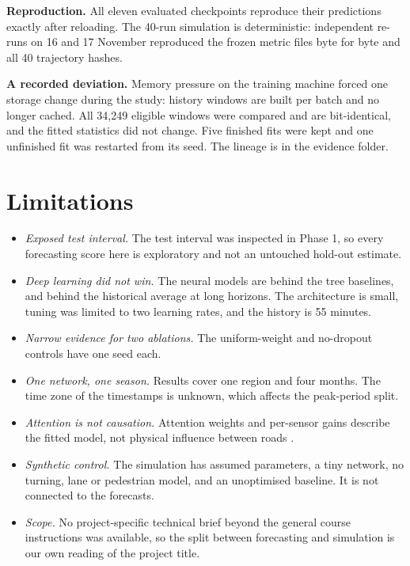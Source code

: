 \documentclass[conference]{IEEEtran}
\begin{document}
\textbf{Reproduction.} All eleven evaluated checkpoints reproduce their predictions exactly after reloading. The 40-run simulation is deterministic: independent re-runs on 16 and 17 November reproduced the frozen metric files byte for byte and all 40 trajectory hashes.

\textbf{A recorded deviation.} Memory pressure on the training machine forced one storage change during the study: history windows are built per batch and no longer cached. All 34,249 eligible windows were compared and are bit-identical, and the fitted statistics did not change. Five finished fits were kept and one unfinished fit was restarted from its seed. The lineage is in the evidence folder.

\section{Limitations}
\begin{itemize}
\item \emph{Exposed test interval.} The test interval was inspected in Phase 1, so every forecasting score here is exploratory and not an untouched hold-out estimate.
\item \emph{Deep learning did not win.} The neural models are behind the tree baselines, and behind the historical average at long horizons. The architecture is small, tuning was limited to two learning rates, and the history is 55 minutes.
\item \emph{Narrow evidence for two ablations.} The uniform-weight and no-dropout controls have one seed each.
\item \emph{One network, one season.} Results cover one region and four months. The time zone of the timestamps is unknown, which affects the peak-period split.
\item \emph{Attention is not causation.} Attention weights and per-sensor gains describe the fitted model, not physical influence between roads \cite{attn}.
\item \emph{Synthetic control.} The simulation has assumed parameters, a tiny network, no turning, lane or pedestrian model, and an unoptimised baseline. It is not connected to the forecasts.
\item \emph{Scope.} No project-specific technical brief beyond the general course instructions was available, so the split between forecasting and simulation is our own reading of the project title.
\end{itemize}
\end{document}
